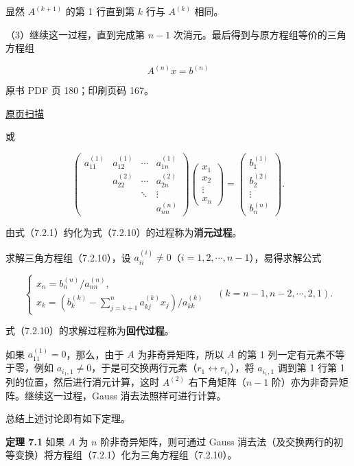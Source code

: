 显然 \(A^{(k+1)}\) 的第 1 行直到第 \(k\) 行与 \(A^{(k)}\) 相同。

（3）继续这一过程，直到完成第 \(n-1\) 次消元。最后得到与原方程组等价的三角方程组

\[A^{(n)}x=b^{(n)}\tag{7.2.10}\]

\clearpage

原书 PDF 页 180；印刷页码 167。

\href{source-images/pdf-180.jpeg}{原页扫描}

或

\[
\begin{pmatrix}
a_{11}^{(1)}&a_{12}^{(1)}&\cdots&a_{1n}^{(1)}\\
&a_{22}^{(2)}&\cdots&a_{2n}^{(2)}\\
&&\ddots&\vdots\\
&&&a_{nn}^{(n)}
\end{pmatrix}
\begin{pmatrix}x_1\\x_2\\\vdots\\x_n\end{pmatrix}
=\begin{pmatrix}b_1^{(1)}\\b_2^{(2)}\\\vdots\\b_n^{(n)}\end{pmatrix}.
\]

由式（7.2.1）约化为式（7.2.10）的过程称为\textbf{消元过程}。

求解三角方程组（7.2.10），设 \(a_{ii}^{(i)}\ne0\)（\(i=1,2,\cdots,n-1\)），易得求解公式

\[
\begin{cases}
x_n=b_n^{(n)}/a_{nn}^{(n)},\\
x_k=\displaystyle\left(b_k^{(k)}-\sum_{j=k+1}^{n}a_{kj}^{(k)}x_j\right)/a_{kk}^{(k)}
\end{cases}
\quad(k=n-1,n-2,\cdots,2,1).
\tag{7.2.11}
\]

式（7.2.10）的求解过程称为\textbf{回代过程}。

如果 \(a_{11}^{(1)}=0\)，那么，由于 \(A\) 为非奇异矩阵，所以 \(A\) 的第 1 列一定有元素不等于零，例如 \(a_{i_1,1}\ne0\)，于是可交换两行元素（\(r_1\leftrightarrow r_{i_1}\)），将 \(a_{i_1,1}\) 调到第 1 行第 1 列的位置，然后进行消元计算，这时 \(A^{(2)}\) 右下角矩阵（\(n-1\) 阶）亦为非奇异矩阵。继续这一过程，Gauss 消去法照样可进行计算。

总结上述讨论即有如下定理。

\textbf{定理 7.1} 如果 \(A\) 为 \(n\) 阶非奇异矩阵，则可通过 Gauss 消去法（及交换两行的初等变换）将方程组（7.2.1）化为三角方程组（7.2.10）。

